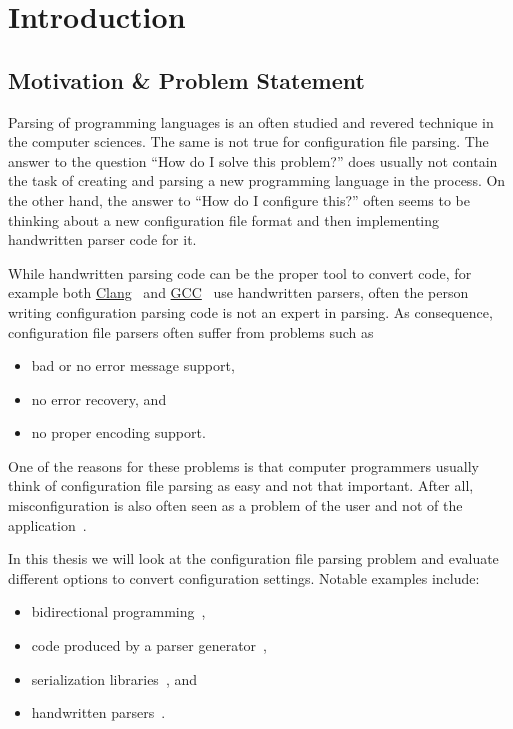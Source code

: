 \chapter{Introduction}

\section{Motivation \& Problem Statement}

Parsing of programming languages is an often studied and revered technique in the computer sciences. The same is not true for configuration file parsing. The answer to the question “How do I solve this problem?” does usually not contain the task of creating and parsing a new programming language in the process. On the other hand, the answer to “How do I configure this?” often seems to be thinking about a new configuration file format and then implementing handwritten parser code for it.

While handwritten parsing code can be the proper tool to convert code, for example both \href{http://clang.llvm.org}{Clang}~\cite{bendersky2012clang} and \href{http://gcc.gnu.org}{GCC}~\cite{myers2008cparser} use handwritten parsers, often the person writing configuration parsing code is not an expert in parsing. As consequence, configuration file parsers often suffer from problems such as

\begin{itemize}
  \item bad or no error message support,
  \item no error recovery, and
  \item no proper encoding support.
\end{itemize}

One of the reasons for these problems is that computer programmers usually think of configuration file parsing as easy and not that important. After all, misconfiguration is also often seen as a problem of the user and not of the application~\cite{xu2013not}.

In this thesis we will look at the configuration file parsing problem and evaluate different options to convert configuration settings. Notable examples include:

\begin{itemize}
  \item bidirectional programming~\cite{foster2005combinators, bohannon2006relational, lutterkort2008augeas, ko2016bigul, raab2016improving},
  \item code produced by a parser generator~\cite{denny2008ielr, parr2014adaptive, warth2016modular, bates2017aprt},
  \item serialization libraries~\cite{sumaray2012cds, pacini2015performance}, and
  \item handwritten parsers~\cite{myers2008cparser, bendersky2012clang}.
\end{itemize}

